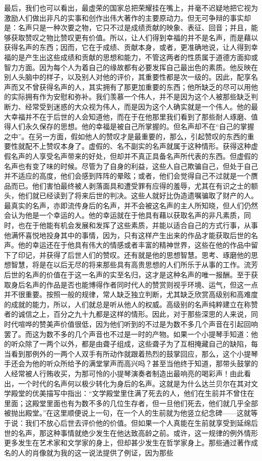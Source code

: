 \documentclass[12pt,oneside]{book}
\begin{document}
最后，我们也可以看出，最虚荣的国家总把荣耀挂在嘴上，并毫不迟疑地把它视为激励人们做出非凡的实事和创作出伟大著作的主要原动力。但无可争辩的事实却是：名声只是一种次要之物，它只不过是成绩贡献的映象、表征、回音；并且，能够获取赞叹之物比赞叹更有价值。所以，让人们得到幸福的并不是名声，而是藉以获得名声的东西；因而，它在于成绩、贡献本身，或者，更准确地说，让人得到幸福的是产生出这些成绩和贡献的思想和能力，不管这两者的性质属于道德方面抑或智力方面。因为每个人为着自己的缘故都有必要发挥自己最出色的素质。他反映在别人头脑中的样子，以及别人对他的评价，其重要性都是次一级的。因此，配享名声而又不曾获得名声的人，其实拥有了那更加重要的东西；他所缺乏的尽可以用他的实际拥有作为安慰和弥补。我们羡慕一个伟人，并不是因为这个人被那些缺乏判断力、经常受到迷惑的大众视为伟人，而是因为这个人确实就是一个伟人。他的最大幸福并不在于后世的人会知道他，而在于在他那里我们看到了那些耐人琢磨、值得人们永久保存的思想。他的幸福是被自己所掌握的。但名声却不在“自己的掌握之中”。在另一方面，假如他人的赞叹才是最重要的，那么，引起赞叹的东西的重要性就配不上赞叹本身了。虚假的、名不副实的名声就属于这种情形。获得这种虚假名声的人享受名声带来的好处，但却并不真正具备名声所代表的东西。但虚假的名声也有变了味的时候。尽管为了自身的利益，这些人自己欺骗自己，但处于自己并不适应的高度，他们会感到阵阵的晕眩；或者，他们会觉得自己不过就是一个赝品而已。他们害怕最终被人剥落面具和遭受罪有应得的羞辱，尤其在有识之士的额头，他们就已经读到了将来后世的判决。这些人就好比伪造遗嘱骗取了财产的人。最真实的名声，亦即流传身后的名声，并不会被这名声的主人所知晓，但人们仍然会认为他是一个幸运的人。他的幸运就在于他具有藉以获取名声的非凡素质，同时，也在于他能有机会发展和发挥了这些素质，并能以适合自己的方式行事，从事他满怀喜悦地投身其中的事情，因为，只有这样产生出来的作品才能获取后世的名声。他的幸运还在于他具有伟大的情感或者丰富的精神世界，这些在他的作品中留下了印记，并获得了后世人们的赞叹。还有就是他的思想智慧。思考、琢磨他的思想智慧，将是在以后无尽的将来那些具有高贵思想的人们所乐于从事的工作。流芳后世的名声的价值在于这一名声的实至名归，这才是这种名声的唯一报酬。至于获取身后名声的作品是否也能博得作者同时代人的赞赏则视乎环境、运气，但这一点并不很重要。按照一般的规律，常人缺乏独立判断，尤其缺乏欣赏高级别和高难度的成就的能力，所以，人们就总是听从他人的权威。高级别的名声纯粹建立在称赞者的诚信之上，百分之九十九都是这样的情形。因此，对于那些深思的人来说，同时代喧哗的赞美声价值很低，因为他们听到的不过是为数不多几个声音在引起回响罢了。而这为数不多的几个声音也不过是一时的产物。如果一个小提琴手知道：他的听众除了一两个以外，都是由聋子组成，这些聋子为了互相掩藏自己的缺陷，每当看到那例外的一两个人双手有所动作就跟着热烈的鼓掌回应，那么，这个小提琴手还会为他的听众所给予的满堂掌声而高兴吗？甚至当他终于知道，那带头鼓掌的人经常被人行贿收买，为那可怜的小提琴演奏者制造出最响亮的喝彩声！由此看出，一个时代的名声何以极少转化为身后的名声。这就是为什么达兰贝尔在其对文学殿堂的优美描写中指出：“文学殿堂里住满了死去的人，他们在生前并不曾住在里面；这殿堂里面也有为数不多的几位生存者，但一旦他们死去，他们就几乎全部被抛出殿堂。”在这里顺便说上一句，在一个人的生前就为他竖立纪念碑——这就等于说：我们不放心后世去评价他的价值。但如果一个人真能在生前就享受到延绵后世的名声，那这种事情就绝少发生在他达致高龄之前。或许，这一规律的例外情形更多发生在艺术家和文学家的身上，但却甚少发生在哲学家身上。那些通过著作成名的人的肖像就为我的这一说法提供了例证，因为那些
\end{document}
